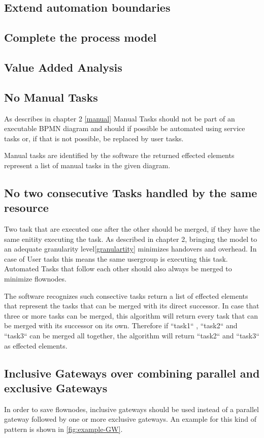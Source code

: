 \subsection{Extend automation boundaries}

\subsection{Complete the process model}

\subsection{Value Added Analysis}

\subsection{No Manual Tasks}
As describes in chapter 2 \ref{manual} Manual Tasks should not be part of an executable BPMN diagram and should if possible be automated using service tasks or, if that is not possible, be replaced by user tasks. 

Manual tasks are identified by the software the returned effected elements represent a list of manual tasks in the given diagram.

\subsection{No two consecutive Tasks handled by the same resource}
Two task that are executed one after the other should be merged, if they have the same enitity executing the task. As described in chapter 2, bringing the model to an adequate granularity level\ref{granulartity} minimizes handovers and overhead. In case of User tasks this means the same usergroup is executing this task. Automated Tasks that follow each other should also always be merged to minimize flownodes.

The software recognizes such consective tasks return a list of effected elements that represent the tasks that can be merged with its direct successor. In case that three or more tasks can be merged, this algorithm will return every task that can be merged with its successor on its own. Therefore if ``task1`` , ``task2`` and ``task3`` can be merged all together, the algorithm will return ``task2`` and ``task3`` as effected elements.
\subsection{Inclusive Gateways over combining parallel and exclusive Gateways}
In order to save flownodes, inclusive gateways should be used instead of a parallel gateway followed by one or more exclusive gateways. An example for this kind of pattern is shown in \ref{fig:example-GW}.

